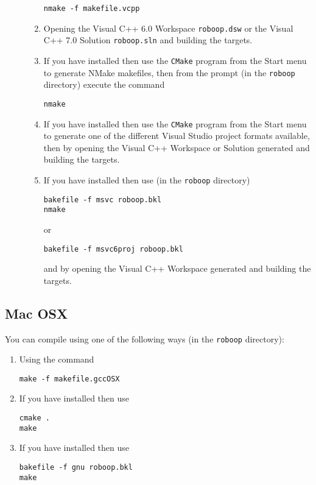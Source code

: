 \documentclass[11pt,fleqn,letterpaper]{report}
\begin{document}
\begin{description}
\begin{enumerate}
\begin{verbatim}
nmake -f makefile.vcpp
\end{verbatim}
  \item Opening the \textsf{Visual C++ 6.0 Workspace}
    \texttt{roboop.dsw} or the \textsf{Visual C++ 7.0 Solution}
    \texttt{roboop.sln} and building the targets.
  \item If you have
    installed then use the \texttt{CMake} program from the
    \textsf{Start} menu to generate \textsf{NMake makefiles}, then
    from the prompt (in the \texttt{roboop} directory) execute the
    command
\begin{verbatim}
nmake
\end{verbatim}
  \item If you have
    installed then use the \texttt{CMake} program from the
    \textsf{Start} menu to generate one of the different
    \textsf{Visual Studio project} formats available, then by opening
    the \textsf{Visual C++ Workspace or Solution} generated and
    building the targets.
  \item If you have
    installed then use (in the \texttt{roboop} directory)
\begin{verbatim}
bakefile -f msvc roboop.bkl
nmake
\end{verbatim}
or
\begin{verbatim}
bakefile -f msvc6proj roboop.bkl
\end{verbatim}
and by opening the \textsf{Visual C++ Workspace} generated and
building the targets.
  \end{enumerate}
\end{description}

\subsection{Mac OSX}

You can compile using one of the following ways (in the
\texttt{roboop} directory):
\begin{enumerate}
\item Using the command 
\begin{verbatim}
make -f makefile.gccOSX
\end{verbatim}
\item If you have
   installed
  then use
\begin{verbatim}
cmake .
make
\end{verbatim}
\item If you have
  installed then use
\begin{verbatim}
bakefile -f gnu roboop.bkl
make
\end{verbatim}
\end{enumerate}
\end{document}
